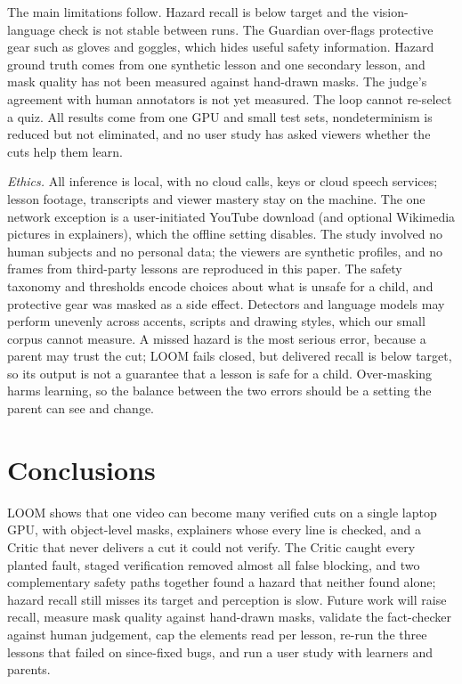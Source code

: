 \documentclass[9pt,a4paper]{extarticle}
\begin{document}
The main limitations follow. Hazard recall is below target and the vision-language check is not stable between runs.
The Guardian over-flags protective gear such as gloves and goggles, which hides useful safety information. Hazard ground
truth comes from one synthetic lesson and one secondary lesson, and mask quality has not been measured against
hand-drawn masks. The judge's agreement with human annotators is not yet measured. The loop cannot re-select a quiz.
All results come from one GPU and small test sets, nondeterminism is reduced but not eliminated, and no user study has
asked viewers whether the cuts help them learn.

\emph{Ethics.} All inference is local, with no cloud calls, keys or cloud speech services; lesson footage, transcripts
and viewer mastery stay on the machine. The one network exception is a user-initiated YouTube download (and optional
Wikimedia pictures in explainers), which the offline setting disables. The study involved no human subjects and no
personal data; the viewers are synthetic profiles, and no frames from third-party lessons are reproduced in this paper.
The safety taxonomy and thresholds encode choices about what is unsafe for a child, and protective gear was masked as a
side effect. Detectors and language models may perform unevenly across accents, scripts and drawing styles, which our
small corpus cannot measure. A missed hazard is the most serious error, because a parent may trust the cut; LOOM fails
closed, but delivered recall is below target, so its output is not a guarantee that a lesson is safe for a child.
Over-masking harms learning, so the balance between the two errors should be a setting the parent can see and change.

\section{Conclusions}
LOOM shows that one video can become many verified cuts on a single laptop GPU, with object-level masks, explainers
whose every line is checked, and a Critic that never delivers a cut it could not verify. The Critic caught every planted
fault, staged verification removed almost all false blocking, and two complementary safety paths together found a hazard
that neither found alone; hazard recall still misses its target and perception is slow. Future work will raise recall,
measure mask quality against hand-drawn masks, validate the fact-checker against human judgement, cap the elements read
per lesson, re-run the three lessons that failed on since-fixed bugs, and run a user study with learners and parents.
\end{document}
